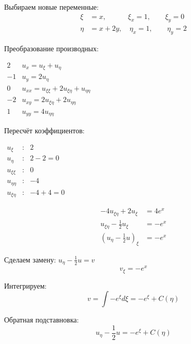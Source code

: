 \documentclass[a4paper,12pt]{article}
\begin{document}
Выбираем новые переменные:
\begin{align*}
    \xi &= x,   \quad \quad \quad  \xi_x = 1,  \quad \quad \xi_y = 0 \\
    \eta &= x + 2y, \quad  \eta_x = 1, \quad \quad \eta_y = 2
\end{align*}

Преобразование производных:
\begin{flushleft}
\(
\begin{array}{r|l}
2 & u_x = u_{\xi} + u_{\eta} \\
-1 & u_y = 2u_{\eta} \\
0 & u_{xx} = u_{\xi\xi} + 2 u_{\xi\eta} + u_{\eta\eta} \\
-2 & u_{xy} = 2 u_{\xi\eta} + 2 u_{\eta\eta} \\
1 & u_{yy} = 4 u_{\eta\eta}
\end{array}
\)
\end{flushleft}

Пересчёт коэффициентов:
\begin{flushleft}
\(
\begin{array}{rcl}
    u_{\xi} &:& 2 \\
    u_{\eta} &:& 2-2=0 \\
    u_{\xi\xi} &:& 0 \\
    u_{\eta\eta} &:& -4 \\
    u_{\xi\eta} &:& -4 + 4 = 0
\end{array}
\)
\end{flushleft}
\begin{equation*}
    \begin{aligned}
        -4u_{\xi\eta} + 2u_{\xi} &= 4e^x \\
        u_{\xi\eta} - \frac{1}{2} u_{\xi} &= -e^x \\
        \left( u_{\eta} - \frac{1}{2} u \right)_{\xi} &= -e^x
    \end{aligned}
\end{equation*}

Сделаем замену: $ u_{\eta} - \frac{1}{2} u = v$
\begin{equation*}
v_{\xi}=-e^x
\end{equation*}

Интегрируем:
\begin{equation*}
    v = \int  - e^{\xi} d\xi =  - e^{\xi} + C(\eta)
\end{equation*}

Обратная подставновка:
\begin{equation*}
    u_{\eta} - \frac{1}{2} u= - e^{\xi} + C(\eta)
\end{equation*}
\end{document}
